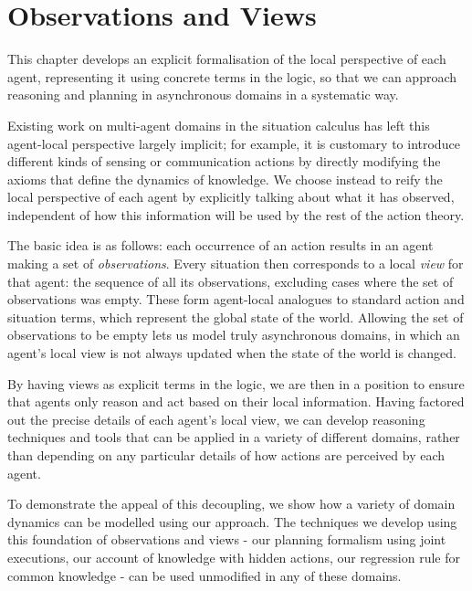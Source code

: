

\chapter{Observations and Views}

\label{ch:observations}

This chapter develops an explicit formalisation of the local perspective
of each agent, representing it using concrete terms in the logic,
so that we can approach reasoning and planning in asynchronous domains
in a systematic way.

Existing work on multi-agent domains in the situation calculus has
left this agent-local perspective largely implicit; for example, it
is customary to introduce different kinds of sensing or communication
actions by directly modifying the axioms that define the dynamics
of knowledge. We choose instead to reify the local perspective of
each agent by explicitly talking about what it has observed, independent
of how this information will be used by the rest of the action theory.

The basic idea is as follows: each occurrence of an action results
in an agent making a set of \emph{observations}. Every situation then
corresponds to a local \emph{view} for that agent: the sequence of
all its observations, excluding cases where the set of observations
was empty. These form agent-local analogues to standard action and
situation terms, which represent the global state of the world. Allowing
the set of observations to be empty lets us model truly asynchronous
domains, in which an agent's local view is not always updated when
the state of the world is changed.

By having views as explicit terms in the logic, we are then in a position
to ensure that agents only reason and act based on their local information.
Having factored out the precise details of each agent's local view,
we can develop reasoning techniques and tools that can be applied
in a variety of different domains, rather than depending on any particular
details of how actions are perceived by each agent.

To demonstrate the appeal of this decoupling, we show how a variety
of domain dynamics can be modelled using our approach. The techniques
we develop using this foundation of observations and views - our planning
formalism using joint executions, our account of knowledge with hidden
actions, our regression rule for common knowledge - can be used unmodified
in any of these domains.

